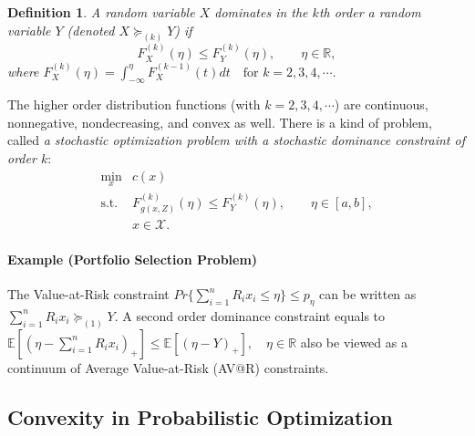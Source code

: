 \documentclass[a4pper,11pt]{article}
\newtheorem{defn}{Definition}[section]
\begin{document}
\begin{defn}
    A random variable $X$ dominates in the $k$th order a random variable $Y$ (denoted $X\succeq_{(k)} Y$) if
    $$F_X^{(k)}(\eta)\leq F_Y^{(k)}(\eta), \qquad \eta \in \mathbb R,$$
    where $F_X^{(k)}(\eta) =\int^\eta_{-\infty} F_X^{(k-1)}(t)dt\quad \text{for }k=2,3,4,\cdots .$
\end{defn}
The higher order distribution functions (with $k=2,3,4,\cdots$) are continuous, nonnegative, nondecreasing, and convex as well.
There is a kind of problem, called \textit{a stochastic optimization problem with a stochastic dominance constraint of order $k$}:
\begin{equation}
    \label{4.1}
    \begin{array}{ll}
        \min_x      & c(x)                                                                \\
        \text{s.t.} & F^{(k)}_{g(x,Z)}(\eta)\leq F^{(k)}_{Y}(\eta),\qquad \eta\in  [a,b], \\
                    & x\in \mathcal X.
    \end{array}
\end{equation}
\paragraph{Example (Portfolio Selection Problem)} The Value-at-Risk constraint $Pr\{\sum_{i=1}^n R_ix_i\leq \eta\}\leq p_\eta$ can be written as $\sum_{i=1}^n R_ix_i\succeq_{(1)}Y$. A second order dominance constraint equals to $\mathbb E[(\eta-\sum_{i=1}^n R_ix_i)_+]\leq \mathbb E[(\eta-Y)_+], \quad \eta\in \mathbb R$ also be viewed as a continuum of Average Value-at-Risk (AV@R) constraints.

\subsection{Convexity in Probabilistic Optimization}
\end{document}
